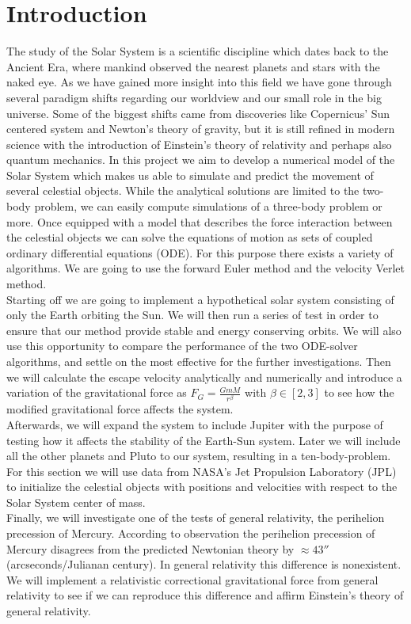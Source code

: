 \documentclass[american,a4paper,12pt]{article}
\begin{document}
\section{Introduction}
The study of the Solar System is a scientific discipline which dates back to the Ancient Era, where mankind observed the nearest planets and stars with the naked eye. As we have gained more insight into this field we have gone through several paradigm shifts regarding our worldview and our small role in the big universe. Some of the biggest shifts came from discoveries like Copernicus' Sun centered system and Newton's theory of gravity, but it is still refined in modern science with the introduction of Einstein's theory of relativity and perhaps also quantum mechanics. In this project we aim to develop a numerical model of the Solar System which makes us able to simulate and predict the movement of several celestial objects. While the analytical solutions are limited to the two-body problem, we can easily compute simulations of a three-body problem or more. Once equipped with a model that describes the force interaction between the celestial objects we can solve the equations of motion as sets of coupled ordinary differential equations (ODE). For this purpose there exists a variety of algorithms. We are going to use the forward Euler method and the velocity Verlet method.\\ 
Starting off we are going to implement a hypothetical solar system consisting of only the Earth orbiting the Sun. We will then run a series of test in order to ensure that our method provide stable and energy conserving orbits. We will also use this opportunity to compare the performance of the two ODE-solver algorithms, and settle on the most effective for the further investigations. Then we will calculate the escape velocity analytically and numerically and introduce a variation of the gravitational force as $F_G = \frac{GmM}{r^{\beta}}$ with $\beta \in [2,3]$ to see how the modified gravitational force affects the system.\\ Afterwards, we will expand the system to include Jupiter with the purpose of testing how it affects the stability of the Earth-Sun system. Later we will include all the other planets and Pluto to our system, resulting in a ten-body-problem. For this section we will use data from NASA's Jet Propulsion Laboratory (JPL) to initialize the celestial objects with positions and velocities with respect to the Solar System center of mass.\\ Finally, we will investigate one of the tests of general relativity, the perihelion precession of Mercury. According to observation the perihelion precession of Mercury disagrees from the predicted Newtonian theory by $\approx 43 ''$ (arcseconds/Julianan century). In general relativity this difference is nonexistent. We will implement a relativistic correctional gravitational force from general relativity to see if we can reproduce this difference and affirm Einstein's theory of general relativity.
\end{document}
